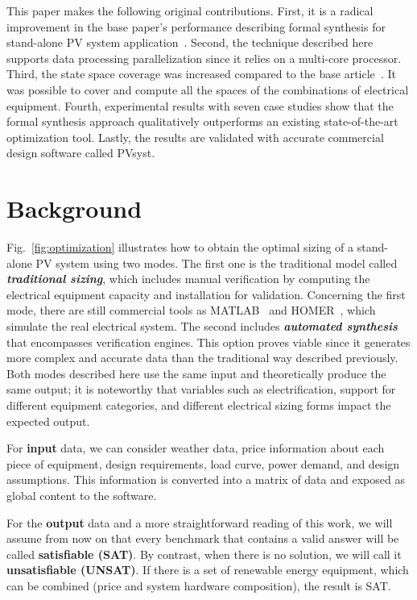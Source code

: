\documentclass[journal]{IEEEtran}
\begin{document}
This paper makes the following original contributions. First, it is a radical improvement in the base paper's performance describing formal synthesis for stand-alone PV system application~\cite{DBLP:journals/corr/abs-1909-13139}. Second, the technique described here supports data processing parallelization since it relies on a multi-core processor. Third, the state space coverage was increased compared to the base article~\cite{VSTTE2020}. It was possible to cover and compute all the spaces of the combinations of electrical equipment. Fourth, experimental results with seven case studies show that the formal synthesis approach qualitatively outperforms an existing state-of-the-art optimization tool. Lastly, the results are validated with accurate commercial design software called PVsyst.

\section{Background}
\label{sec:AutomatedVerification}
Fig.~\ref{fig:optimization} illustrates how to obtain the optimal sizing of a stand-alone PV system using two modes. The first one is the traditional model called \textit{\textbf{traditional sizing}}, which includes manual verification by computing the electrical equipment capacity and installation for validation. Concerning the first mode, there are still commercial tools as MATLAB~\cite{Benatiallah2017} and HOMER~\cite{Pradhan,Swarnkar}, which simulate the real electrical system. The second includes \textbf{\textit{automated synthesis}} that encompasses verification engines. This option proves viable since it generates more complex and accurate data than the traditional way described previously. Both modes described here use the same input and theoretically produce the same output; it is noteworthy that variables such as electrification, support for different equipment categories, and different electrical sizing forms impact the expected output.

For \textbf{input} data, we can consider weather data, price information about each piece of equipment, design requirements, load curve, power demand, and design assumptions. This information is converted into a matrix of data and exposed as global content to the software.

For the \textbf{output} data and a more straightforward reading of this work, we will assume from now on that every benchmark that contains a valid answer will be called \textbf{satisfiable (SAT)}. By contrast, when there is no solution, we will call it \textbf{unsatisfiable (UNSAT)}. If there is a set of renewable energy equipment, which can be combined (price and system hardware composition), the result is SAT.
\end{document}

